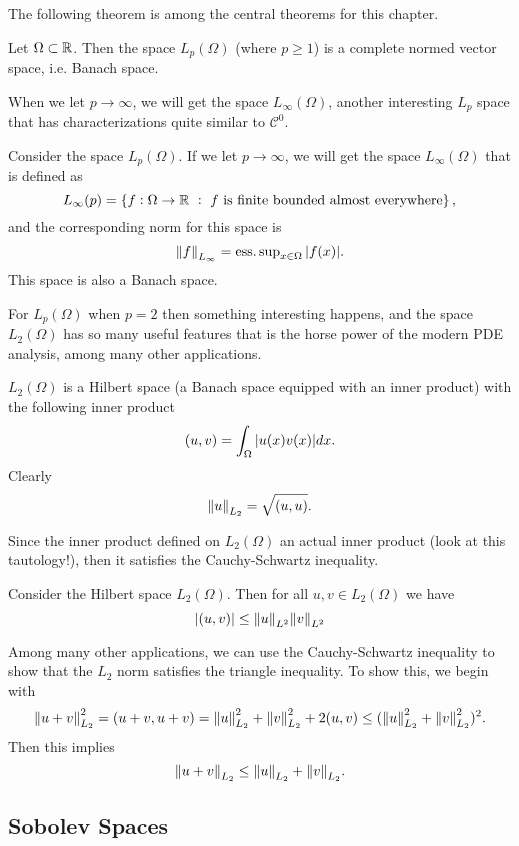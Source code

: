 The following theorem is among the central theorems for this chapter. 

\begin{theorem}
	Let $ \Omega\subset \mathbb{R}$. Then the space $ L_p(\Omega) $ (where $ p \geq 1 $) is a complete normed vector space, i.e. Banach space. 
\end{theorem}

When we let $ p\to \infty $, we will get the space $ L_\infty(\Omega) $, another interesting $ L_p  $ space that has characterizations quite similar to $ \mathscr{C}^0 $. 

\begin{proposition}
	Consider the space $ L_p(\Omega) $. If we let $ p\to \infty $, we will get the space $ L_\infty(\Omega) $ that is defined as
	\[ L_\infty(p) = \left\{ f: \Omega\to \mathbb{R}\ :\ \text{$ f $ is finite bounded almost everywhere} \right\}, \]
	and the corresponding norm for this space is
	\[ \norm{f}_{L_\infty} = \operatorname{ess.sup}_{x\in \Omega} |f(x)|. \]
	This space is also a Banach space. 
\end{proposition}


For $ L_p(\Omega) $ when $ p=2 $ then something interesting happens, and the space $ L_2(\Omega) $ has so many useful features that is the horse power of the modern PDE analysis, among many other applications. 

\begin{proposition}
	$ L_2(\Omega) $ is a Hilbert space (a Banach space equipped with an inner product) with the following inner product
	\[ (u,v) = \int_\Omega |u(x)v(x)| dx. \]
	Clearly
	\[ \norm{u}_{L_2} = \sqrt{(u,u)}. \]
\end{proposition}
Since the inner product defined on $ L_2(\Omega) $ an actual inner product (look at this tautology!), then it satisfies the Cauchy-Schwartz inequality.

\begin{proposition}
	Consider the Hilbert space $ L_2(\Omega) $. Then for all $ u,v \in L_2(\Omega) $ we have
	\[ |(u,v)| \leq \norm{u}_{L^2} \norm{v}_{L^2} \]
\end{proposition} 

\begin{remark}
	Among many other applications, we can use the Cauchy-Schwartz inequality to show that the $ L_2 $ norm satisfies the triangle inequality. To show this, we begin with
	\[  \norm{u+v}_{L_2}^2 = (u+v,u+v) = \norm{u}^2_{L_2} + \norm{v}^2_{L_2} + 2(u,v) \leq (\norm{u}^2_{L_2} + \norm{v}^2_{L_2})^2 . \]
	Then this implies
	\[ \norm{u+v}_{L_2} \leq \norm{u}_{L_2} + \norm{v}_{L_2}. \]
\end{remark}

\subsection{Sobolev Spaces}